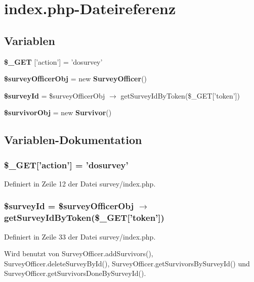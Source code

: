\section{index.php-Dateireferenz}
\label{survey_2index_8php}
\subsection*{Variablen}
\begin{CompactItemize}
\item 
{\bf \$\_\-GET} ['action'] = 'dosurvey'
\item 
{\bf \$surveyOfficerObj} = new {\bf SurveyOfficer}()
\item 
{\bf \$surveyId} = \$surveyOfficerObj $\rightarrow$ getSurveyIdByToken(\$\_\-GET['token'])
\item 
{\bf \$survivorObj} = new {\bf Survivor}()
\end{CompactItemize}


\subsection{Variablen-Dokumentation}
\subsubsection{\setlength{\rightskip}{0pt plus 5cm}\$\_\-GET['action'] = 'dosurvey'}\label{survey_2index_8php_adfe36d0024c98a104c6592111fa6669}




Definiert in Zeile 12 der Datei survey/index.php.
\subsubsection{\setlength{\rightskip}{0pt plus 5cm}\$surveyId = \$surveyOfficerObj $\rightarrow$ getSurveyIdByToken(\$\_\-GET['token'])}\label{survey_2index_8php_b8b9f56a8ae8ed97d290ef81e73e9de9}




Definiert in Zeile 33 der Datei survey/index.php.

Wird benutzt von SurveyOfficer.addSurvivors(), SurveyOfficer.deleteSurveyById(), SurveyOfficer.getSurvivorsBySurveyId() und SurveyOfficer.getSurvivorsDoneBySurveyId().

